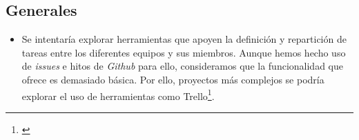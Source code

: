 \documentclass[11pt, a4paper, titlepage]{article}
\begin{document}
\subsection{Generales}
\begin{itemize}
    \item Se intentaría explorar herramientas que apoyen la definición y repartición de tareas entre los diferentes equipos y sus miembros. Aunque hemos hecho uso de \textit{issues} e hitos de \textit{Github} para ello, consideramos que la funcionalidad que ofrece es demasiado básica. Por ello, proyectos más complejos se podría explorar el uso de herramientas como Trello\footnote{\href{https://trello.com/es}{}}.
\end{itemize}


\end{document}
